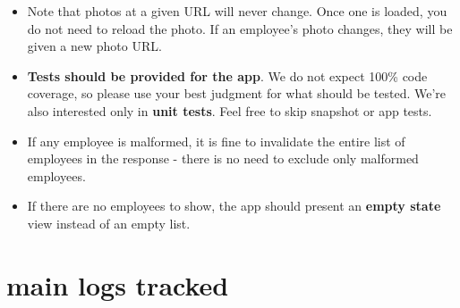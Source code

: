 \documentclass[9pt, b5paper]{article}
\begin{document}
\begin{itemize}
\item Note that photos at a given URL will never change. Once one is loaded, you do not need to reload the photo. If an employee’s photo changes, they will be given a new photo URL.
\item \textbf{Tests should be provided for the app}. We do not expect 100\% code coverage, so please use your best judgment for what should be tested. We’re also interested only in \textbf{unit tests}. Feel free to skip snapshot or app tests.
\item If any employee is malformed, it is fine to invalidate the entire list of employees in the response - there is no need to exclude only malformed employees.
\item If there are no employees to show, the app should present an \textbf{empty state} view instead of an empty list.
\end{itemize}

\section{main logs tracked}
\label{sec-3}
\end{document}
